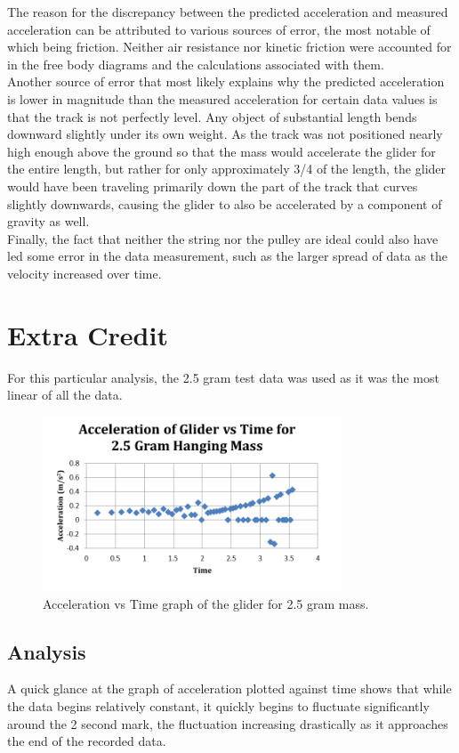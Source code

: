 \documentclass[titlepage]{article}
\begin{document}
The reason for the discrepancy between the predicted acceleration and measured acceleration can be attributed to various sources of error, the most notable of which being friction. Neither air resistance nor kinetic friction were accounted for in the free body diagrams and the calculations associated with them. \\
Another source of error that most likely explains why the predicted acceleration is lower in magnitude than the measured acceleration for certain data values is that the track is not perfectly level. Any object of substantial length bends downward slightly under its own weight. As the track was not positioned nearly high enough above the ground so that the mass would accelerate the glider for the entire length, but rather for only approximately 3/4 of the length, the glider would have been traveling primarily down the part of the track that curves slightly downwards, causing the glider to also be accelerated by a component of gravity as well. \\
Finally, the fact that neither the string nor the pulley are ideal could also have led some error in the data measurement, such as the larger spread of data as the velocity increased over time.

\pagebreak

\section{Extra Credit}

For this particular analysis, the 2.5 gram test data was used as it was the most linear of all the data.

\begin{figure}[ht]
    \centering
    \includegraphics[width=3.5in]{ExtraCredit.png}
    \caption{Acceleration vs Time graph of the glider for 2.5 gram mass.}
\end{figure}

\subsection{Analysis}
A quick glance at the graph of acceleration plotted against time shows that while the data begins relatively constant, it quickly begins to fluctuate significantly around the 2 second mark, the fluctuation increasing drastically as it approaches the end of the recorded data. 
\end{document}
